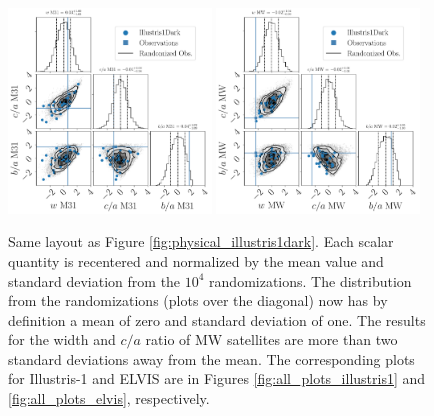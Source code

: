 \documentclass[a4paper,fleqn,usenatbib]{mnras}
\begin{document}
\begin{figure}
\centering
\includegraphics[width=0.48\textwidth]{input_illustris1dark_obs_M31_n_11_normed.pdf}
\includegraphics[width=0.48\textwidth]{input_illustris1dark_obs_MW_n_11_normed.pdf}
\caption{
Same layout as Figure \ref{fig:physical_illustris1dark}. 
  Each scalar
  quantity is recentered and normalized by the mean value and standard
  deviation from the $10^4$ randomizations. 
  The distribution from the randomizations (plots over the diagonal)
  now has by definition a mean of zero and standard deviation of one. 
The results for the width and $c/a$ ratio of MW satellites are more
than two standard deviations away from the mean. 
The corresponding plots for Illustris-1 and ELVIS are
in Figures \ref{fig:all_plots_illustris1} and
\ref{fig:all_plots_elvis},
respectively. \label{fig:normalized_illustris1dark}}     
\end{figure}
\end{document}
